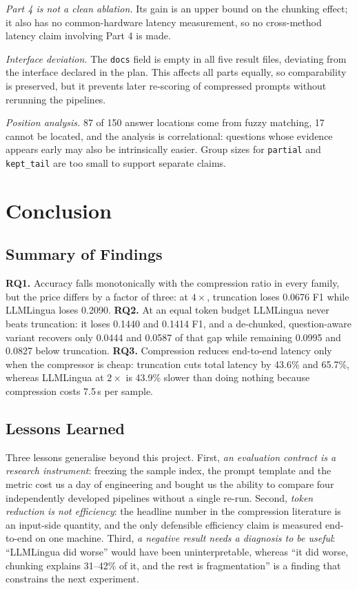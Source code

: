 \documentclass[10pt,a4paper,twocolumn]{article}
\begin{document}
\emph{Part 4 is not a clean ablation.} Its gain is an upper bound on the chunking
effect; it also has no common-hardware latency measurement, so no cross-method
latency claim involving Part 4 is made.

\emph{Interface deviation.} The \texttt{docs} field is empty in all five result
files, deviating from the interface declared in the plan. This affects all parts
equally, so comparability is preserved, but it prevents later re-scoring of
compressed prompts without rerunning the pipelines.

\emph{Position analysis.} 87 of 150 answer locations come from fuzzy matching, 17
cannot be located, and the analysis is correlational: questions whose evidence
appears early may also be intrinsically easier. Group sizes for
\texttt{partial} and \texttt{kept\_tail} are too small to support separate claims.

\section{Conclusion}

\subsection{Summary of Findings}

\textbf{RQ1.} Accuracy falls monotonically with the compression ratio in every
family, but the price differs by a factor of three: at $4\times$, truncation loses
0.0676 F1 while LLMLingua loses 0.2090. \textbf{RQ2.} At an equal token budget
LLMLingua never beats truncation: it loses 0.1440 and 0.1414 F1, and a
de-chunked, question-aware variant recovers only 0.0444 and 0.0587 of that gap
while remaining 0.0995 and 0.0827 below truncation. \textbf{RQ3.} Compression
reduces end-to-end latency only when the compressor is cheap: truncation cuts
total latency by 43.6\% and 65.7\%, whereas LLMLingua at $2\times$ is 43.9\%
slower than doing nothing because compression costs 7.5\,s per sample.

\subsection{Lessons Learned}

Three lessons generalise beyond this project. First, \emph{an evaluation contract
is a research instrument}: freezing the sample index, the prompt template and the
metric cost us a day of engineering and bought us the ability to compare four
independently developed pipelines without a single re-run. Second, \emph{token
reduction is not efficiency}: the headline number in the compression literature is
an input-side quantity, and the only defensible efficiency claim is measured
end-to-end on one machine. Third, \emph{a negative result needs a diagnosis to be
useful}: ``LLMLingua did worse'' would have been uninterpretable, whereas
``it did worse, chunking explains 31--42\% of it, and the rest is fragmentation''
is a finding that constrains the next experiment.
\end{document}
